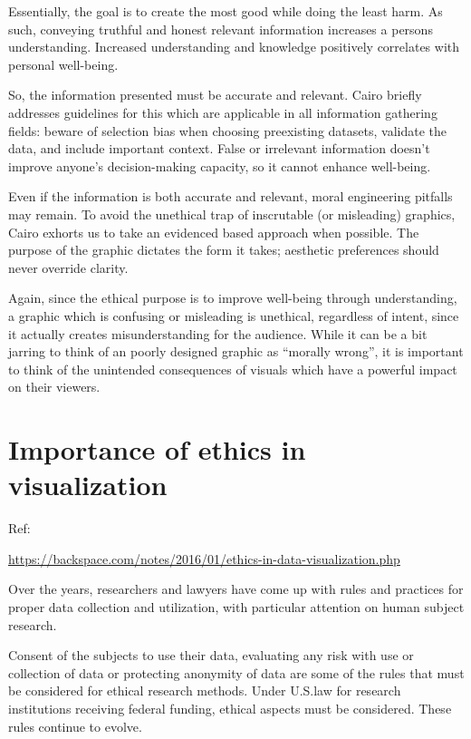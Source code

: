 \documentclass[]{book}
\theoremstyle{definition}
\theoremstyle{definition}
\theoremstyle{definition}
\theoremstyle{remark}
\begin{document}
Essentially, the goal is to create the most good while doing the least
harm. As such, conveying truthful and honest relevant information
increases a persons understanding. Increased understanding and knowledge
positively correlates with personal well-being.

So, the information presented must be accurate and relevant. Cairo
briefly addresses guidelines for this which are applicable in all
information gathering fields: beware of selection bias when choosing
preexisting datasets, validate the data, and include important context.
False or irrelevant information doesn't improve anyone's decision-making
capacity, so it cannot enhance well-being.

Even if the information is both accurate and relevant, moral engineering
pitfalls may remain. To avoid the unethical trap of inscrutable (or
misleading) graphics, Cairo exhorts us to take an evidenced based
approach when possible. The purpose of the graphic dictates the form it
takes; aesthetic preferences should never override clarity.

Again, since the ethical purpose is to improve well-being through
understanding, a graphic which is confusing or misleading is unethical,
regardless of intent, since it actually creates misunderstanding for the
audience. While it can be a bit jarring to think of an poorly designed
graphic as ``morally wrong'', it is important to think of the unintended
consequences of visuals which have a powerful impact on their viewers.

\section{Importance of ethics in
visualization}\label{importance-of-ethics-in-visualization}

Ref:

\url{https://backspace.com/notes/2016/01/ethics-in-data-visualization.php}

Over the years, researchers and lawyers have come up with rules and
practices for proper data collection and utilization, with particular
attention on human subject research.

Consent of the subjects to use their data, evaluating any risk with use
or collection of data or protecting anonymity of data are some of the
rules that must be considered for ethical research methods. Under
U.S.law for research institutions receiving federal funding, ethical
aspects must be considered. These rules continue to evolve.
\end{document}
